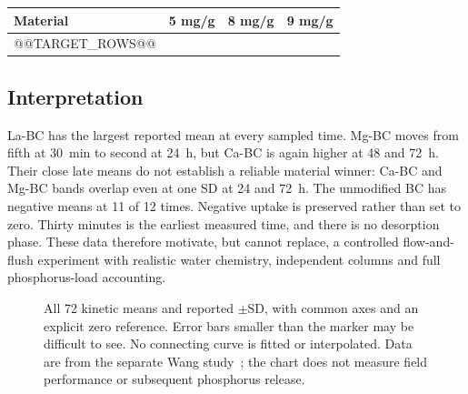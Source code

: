 \documentclass[11pt,letterpaper]{article}
\begin{document}
\begin{center}\begin{minipage}{\textwidth}\centering\small
{}
\begin{tabular}{@{}llll@{}}\toprule
Material & 5 mg/g & 8 mg/g & 9 mg/g\\\midrule
@@TARGET_ROWS@@
\bottomrule\end{tabular}
\end{minipage}\end{center}

\subsection{Interpretation}
La-BC has the largest reported mean at every sampled time. Mg-BC moves from fifth at 30~min to second at 24~h, but Ca-BC is again higher at 48 and 72~h. Their close late means do not establish a reliable material winner: Ca-BC and Mg-BC bands overlap even at one SD at 24 and 72~h. The unmodified BC has negative means at 11 of 12 times. Negative uptake is preserved rather than set to zero. Thirty minutes is the earliest measured time, and there is no desorption phase. These data therefore motivate, but cannot replace, a controlled flow-and-flush experiment with realistic water chemistry, independent columns and full phosphorus-load accounting.

\clearpage
\begin{figure}[p]\centering
{}
\caption{All 72 kinetic means and reported $\pm$SD, with common axes and an explicit zero reference. Error bars smaller than the marker may be difficult to see. No connecting curve is fitted or interpolated. Data are from the separate Wang study~\cite{wangdata}; the chart does not measure field performance or subsequent phosphorus release.}
\label{fig:kinetics}
\end{figure}
\end{document}
